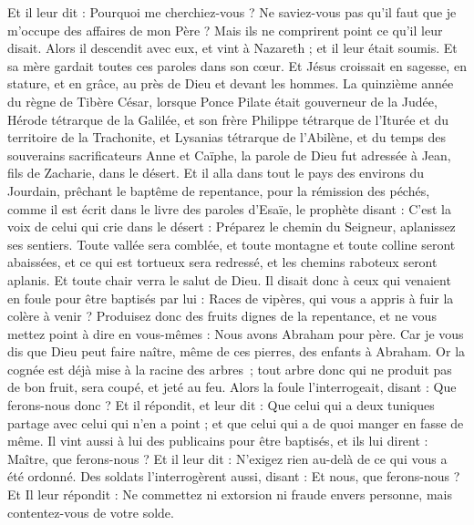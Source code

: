\begin{multicols}{2}
Et il leur dit : Pourquoi me cherchiez-vous ? Ne saviez-vous pas qu'il faut que je m'occupe des affaires de mon Père ?
Mais ils ne comprirent point ce qu'il leur disait.
Alors il descendit avec eux, et vint à Nazareth ; et il leur était soumis. Et sa mère gardait toutes ces paroles dans son cœur.
Et Jésus croissait en sagesse, en stature, et en grâce, au près de Dieu et devant les hommes.
\VerseOne{}La quinzième année du règne de Tibère César, lorsque Ponce Pilate était gouverneur de la Judée, Hérode tétrarque de la Galilée, et son frère Philippe tétrarque de l'Iturée et du territoire de la Trachonite, et Lysanias tétrarque de l'Abilène,
et du temps des souverains sacrificateurs Anne et Caïphe, la parole de Dieu fut adressée à Jean, fils de Zacharie, dans le désert.
Et il alla dans tout le pays des environs du Jourdain, prêchant le baptême de repentance, pour la rémission des péchés,
comme il est écrit dans le livre des paroles d'Esaïe, le prophète disant : C'est la voix de celui qui crie dans le désert : Préparez le chemin du Seigneur, aplanissez ses sentiers.
Toute vallée sera comblée, et toute montagne et toute colline seront abaissées, et ce qui est tortueux sera redressé, et les chemins raboteux seront aplanis.
Et toute chair verra le salut de Dieu.
Il disait donc à ceux qui venaient en foule pour être baptisés par lui : Races de vipères, qui vous a appris à fuir la colère à venir ?
Produisez donc des fruits dignes de la repentance, et ne vous mettez point à dire en vous-mêmes : Nous avons Abraham pour père. Car je vous dis que Dieu peut faire naître, même de ces pierres, des enfants à Abraham.
Or la cognée est déjà mise à la racine des arbres ; tout arbre donc qui ne produit pas de bon fruit, sera coupé, et jeté au feu.
Alors la foule l'interrogeait, disant : Que ferons-nous donc ?
Et il répondit, et leur dit : Que celui qui a deux tuniques partage avec celui qui n'en a point ; et que celui qui a de quoi manger en fasse de même.
Il vint aussi à lui des publicains pour être baptisés, et ils lui dirent : Maître, que ferons-nous ?
Et il leur dit : N'exigez rien au-delà de ce qui vous a été ordonné.
Des soldats l'interrogèrent aussi, disant : Et nous, que ferons-nous ? Et Il leur répondit : Ne commettez ni extorsion ni fraude envers personne, mais contentez-vous de votre solde.

\end{multicols}
